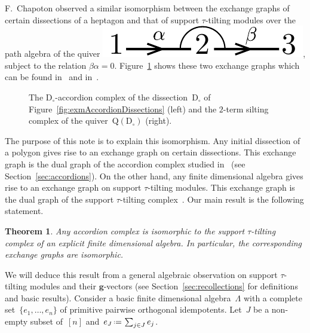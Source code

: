 \documentclass{amsart}
\newtheorem{theorem}{Theorem}%
\theoremstyle{definition}
\renewcommand{\b}[1]{\mathbf{#1}} %
\newcommand{\eqdef}{\mbox{\,\raisebox{0.2ex}{\scriptsize\ensuremath{\mathrm:}}\ensuremath{=}\,}} %
\newcommand{\fref}[1]{Figure~\ref{#1}} %
\newcommand{\dissection}{\mathrm{D}} %
\newcommand{\quiver}{\mathrm{Q}} %
\begin{document}
F.~Chapoton observed a similar isomorphism between the exchange graphs of certain dissections of a heptagon and that of support $\tau$-tilting modules over the path algebra of the quiver \includegraphics[scale=.35]{relation}, subject to the relation $\beta\alpha = 0$. \fref{fig:accordiohedron} shows these two exchange graphs which can be found in~\cite[Fig.~7]{Chapoton-quadrangulations} and in~\cite[Exm.~6.4]{AdachiIyamaReiten}. %

\begin{figure}
	\capstart
	\centerline{\accordiohedronAccordionTikz{}\accordiohedronSiltingTikz{}}
	\caption{The $\dissection_\circ$-accordion complex of the dissection~$\dissection_\circ$ of \fref{fig:exmAccordionDissections} (left) and the $2$-term silting complex of the quiver~$\quiver(\dissection_\circ)$ (right).}
	\label{fig:accordiohedron}
\end{figure}

The purpose of this note is to explain this isomorphism.
Any initial dissection of a polygon gives rise to an exchange graph on certain dissections.
This exchange graph is the dual graph of the accordion complex studied in~\cite{Chapoton-quadrangulations, GarverMcConville, MannevillePilaud-accordion} (see Section~\ref{sec:accordions}).
On the other hand, any finite dimensional algebra gives rise to an exchange graph on support $\tau$-tilting modules. This exchange graph is the dual graph of the support $\tau$-tilting complex~\cite{AdachiIyamaReiten}.
Our main result is the following statement.

\begin{theorem}
Any accordion complex is isomorphic to the support $\tau$-tilting complex of an explicit finite dimensional algebra. In particular, the corresponding exchange graphs are isomorphic.
\end{theorem}

We will deduce this result from a general algebraic observation on support $\tau$-tilting modules and their $\b{g}$-vectors (see Section~\ref{sec:recollections} for definitions and basic results).
Consider a basic finite dimensional algebra~$\Lambda$ with a complete set~$\{e_1, \dots, e_n\}$ of primitive pairwise orthogonal idempotents. 
Let~$J$ be a non-empty subset of~$[n]$ and~$e_J \eqdef \sum_{j \in J} e_j$.
\end{document}

